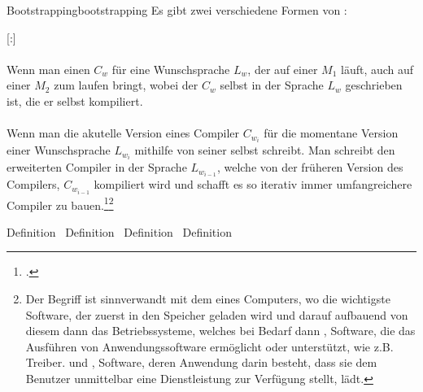 \begin{Definition}{Bootstrapping}{bootstrapping}
  Es gibt zwei verschiedene Formen von :

  \titleformat{\paragraph}[runin]{\normalfont\normalsize\bfseries}{}{0mm}{}[:]

  \paragraph{}\label{par:bootstrapping1}\hspace{-0.25cm}
  Wenn man einen  $C_w$ für eine Wunschsprache $L_w$, der auf einer  $M_1$ läuft, auch auf einer  $M_2$ zum laufen bringt, wobei der  $C_w$ selbst in der Sprache $L_w$ geschrieben ist, die er selbst kompiliert.

  \paragraph{}\label{par:bootstrapping2}\hspace{-0.25cm}
  Wenn man die akutelle Version eines Compiler $C_{w_i}$ für die momentane Version einer Wunschsprache $L_{w_i}$ mithilfe von  seiner selbst schreibt. Man schreibt den erweiterten Compiler in der Sprache $L_{w_{i-1}}$, welche von der früheren Version des Compilers, $C_{w_{i-1}}$ kompiliert wird und schafft es so iterativ immer umfangreichere Compiler zu bauen.\footcite{earley_formalism_1970}\footnote{Der Begriff ist sinnverwandt mit dem  eines Computers, wo die wichtigste Software, der  zuerst in den Speicher geladen wird und darauf aufbauend von diesem dann das Betriebssysteme, welches bei Bedarf dann , Software, die das Ausführen von Anwendungssoftware ermöglicht oder unterstützt, wie z.B. Treiber. und , Software, deren Anwendung darin besteht, dass sie dem Benutzer unmittelbar eine Dienstleistung zur Verfügung stellt, lädt.}
\end{Definition}

Definition~
Definition~
Definition~
Definition~
